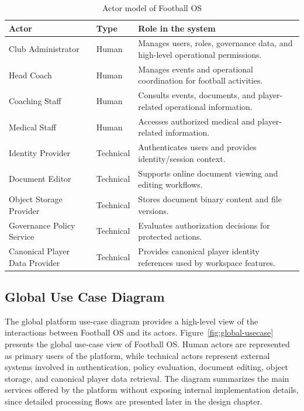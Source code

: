 \begin{table}[H]
\centering
\caption{Actor model of Football OS}
\label{tab:actor-model}
\small
\setlength{\tabcolsep}{4pt}
\renewcommand{\arraystretch}{1.10}
\begin{tabularx}{\textwidth}{|L{3.0cm}|C{1.9cm}|Y|}
\hline
\textbf{Actor} & \textbf{Type} & \textbf{Role in the system} \\
\hline
Club Administrator & Human & Manages users, roles, governance data, and high-level operational permissions. \\
\hline
Head Coach & Human & Manages events and operational coordination for football activities. \\
\hline
Coaching Staff & Human & Consults events, documents, and player-related operational information. \\
\hline
Medical Staff & Human & Accesses authorized medical and player-related information. \\
\hline
Identity Provider & Technical & Authenticates users and provides identity/session context. \\
\hline
Document Editor & Technical & Supports online document viewing and editing workflows. \\
\hline
Object Storage Provider & Technical & Stores document binary content and file versions. \\
\hline
Governance Policy Service & Technical & Evaluates authorization decisions for protected actions. \\
\hline
Canonical Player Data Provider & Technical & Provides canonical player identity references used by workspace features. \\
\hline
\end{tabularx}
\normalsize
\end{table}

\subsection{Global Use Case Diagram}

The global platform use-case diagram provides a high-level view of the
interactions between Football OS and its actors. Figure~\ref{fig:global-usecase}
presents the global use-case view of Football OS. Human actors are represented
as primary users of the platform, while technical actors represent external
systems involved in authentication, policy evaluation, document editing, object
storage, and canonical player data retrieval. The diagram summarizes the main
services offered by the platform without exposing internal implementation
details, since detailed processing flows are presented later in the design
chapter.

